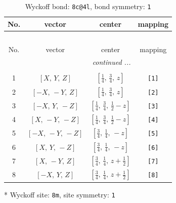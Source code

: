 \documentclass[fleqn,8pt]{jsarticle}
\begin{document}
\renewcommand{\arraystretch}{1.2}
\begin{longtable}{cccc}
\caption{Wyckoff bond: {\tt 8c@4l}, bond symmetry: {\tt 1}}
 \\
 \hline \hline
No. & vector & center & mapping \\ \hline \endfirsthead

\multicolumn{3}{l}{\tablename\ \thetable{}} \\
 \hline \hline
No. & vector & center & mapping \\ \hline \endhead

 \hline \hline
\multicolumn{3}{r}{\footnotesize\it continued ...} \\ \endfoot

 \hline \hline
\multicolumn{3}{r}{} \\ \endlastfoot

1 & $\left[ X,\, Y,\, Z \right]$ & $\left[ \frac{1}{4},\, \frac{3}{4},\, z \right]$ & {\tt [1]} \\ \hline
2 & $\left[ - X,\, - Y,\, Z \right]$ & $\left[ \frac{1}{4},\, \frac{3}{4},\, z \right]$ & {\tt [2]} \\ \hline
3 & $\left[ - X,\, Y,\, - Z \right]$ & $\left[ \frac{1}{4},\, \frac{3}{4},\, \frac{1}{2} - z \right]$ & {\tt [3]} \\ \hline
4 & $\left[ X,\, - Y,\, - Z \right]$ & $\left[ \frac{1}{4},\, \frac{3}{4},\, \frac{1}{2} - z \right]$ & {\tt [4]} \\ \hline
5 & $\left[ - X,\, - Y,\, - Z \right]$ & $\left[ \frac{3}{4},\, \frac{1}{4},\, - z \right]$ & {\tt [5]} \\ \hline
6 & $\left[ X,\, Y,\, - Z \right]$ & $\left[ \frac{3}{4},\, \frac{1}{4},\, - z \right]$ & {\tt [6]} \\ \hline
7 & $\left[ X,\, - Y,\, Z \right]$ & $\left[ \frac{3}{4},\, \frac{1}{4},\, z + \frac{1}{2} \right]$ & {\tt [7]} \\ \hline
8 & $\left[ - X,\, Y,\, Z \right]$ & $\left[ \frac{3}{4},\, \frac{1}{4},\, z + \frac{1}{2} \right]$ & {\tt [8]} \\
\end{longtable}
* Wyckoff site: {\tt 8m}, site symmetry: {\tt 1}
\renewcommand{\arraystretch}{1.2}
\end{document}

